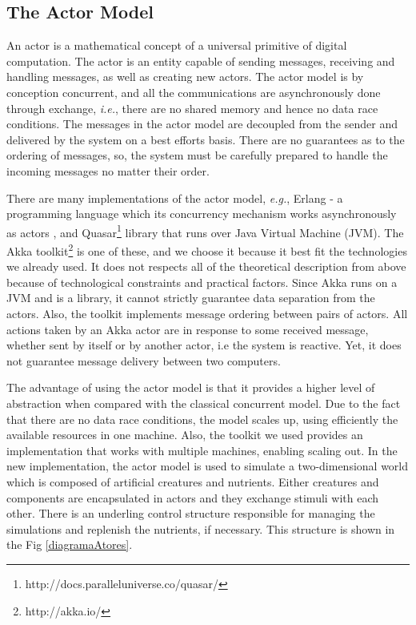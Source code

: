 \documentclass[runningheads]{llncs}
\begin{document}
\subsection{The Actor Model}
\label{subsec:actors}
An actor is a mathematical concept of a universal primitive of digital computation\cite{Hewitt2012}. The actor is an entity capable of sending messages, receiving and handling messages, as well as creating new actors. The actor model is by conception concurrent, and all the communications are asynchronously done through exchange, \textit{i.e.},  there are no shared memory and hence no data race conditions. The messages in the actor model are decoupled from the sender and delivered by the system on a best efforts basis\cite{Hewitt2014}. There are no guarantees as to the ordering of messages, so, the system must be carefully prepared to handle the incoming messages no matter their order.

There are many implementations of the actor model, \textit{e.g.}, Erlang - a programming language which its concurrency mechanism works  asynchronously as actors \cite{Armstrong2007}, and Quasar\footnote[1]{http://docs.paralleluniverse.co/quasar/} library that runs over Java Virtual Machine (JVM). The Akka toolkit\footnote[2]{http://akka.io/} is one of these, and we choose it because it best fit the technologies we already used. It does not respects all of the theoretical description from above because of technological constraints and practical factors. Since Akka runs on a JVM and is a library, it cannot strictly guarantee data separation from the actors. Also, the toolkit implements message ordering between pairs of actors. All actions taken by an Akka actor are in response to some received message, whether sent by itself or by another actor, i.e the system is reactive. Yet, it does not guarantee message delivery between two computers.

The advantage of using the actor model is that it provides a higher level of abstraction when compared with the classical concurrent model. Due to the fact that there are no data race conditions, the model scales up, using efficiently the available resources in one machine. Also, the toolkit we used provides an implementation that works with multiple machines, enabling scaling out. In the new implementation, the actor model is used to simulate a two-dimensional world which is composed of artificial creatures and nutrients. Either creatures and components are encapsulated in actors and they exchange stimuli with each other. There is an underling control structure responsible for managing the simulations and replenish the nutrients, if necessary. This structure is shown in the Fig \ref{diagramaAtores}. 
\end{document}
